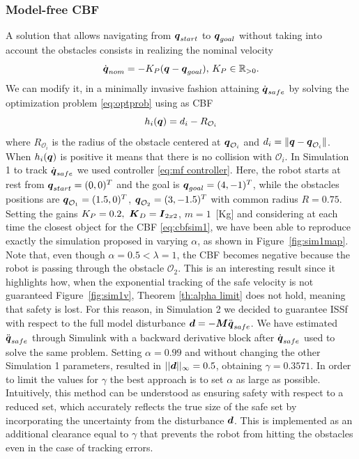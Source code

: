 \subsubsection{Model-free CBF}
A solution that allows navigating from ${\boldsymbol{q}}_{start}$ to ${\boldsymbol{q}}_{goal}$ without taking into account the obstacles consists in realizing the nominal velocity   
\begin{equation}
    \dot{{\boldsymbol{q}}}_{nom}=-K_P({\boldsymbol{q}} - {\boldsymbol{q}}_{goal}),\,K_P\in\mathbb{R}_{>0}.
\end{equation}
We can modify it, in a minimally invasive fashion attaining $\dot{\boldsymbol{q}}_{safe}$ by solving the optimization problem \eqref{eq:optprob} using as CBF
\begin{equation}\label{eq:cbfsim1}
h_i({\boldsymbol{q}})=d_{i}-R_{\mathcal{O}_i}
\end{equation}
 where $R_{\mathcal{O}_i}$ is the radius of the obstacle centered at ${\boldsymbol{q}}_{\mathcal{O}_i}$ and $d_{i} = \lVert {\boldsymbol{q}}-{\boldsymbol{q}}_{\mathcal{O}_i} \rVert$.
When $h_i({\boldsymbol{q}})$ is positive it means that there is no collision with $\mathcal{O}_i$.
In Simulation 1 to track $\dot{\boldsymbol{q}}_{safe}$ we used controller \eqref{eq:mf controller}. Here, the robot starts at rest from ${\boldsymbol{q}}_{start}=(0,0)^T$ and the goal is ${\boldsymbol{q}}_{goal}=(4,-1)^T$, while the obstacles positions are ${\boldsymbol{q}}_{\mathcal{O}_1}=(1.5,0)^T$, ${\boldsymbol{q}}_{\mathcal{O}_2}=(3,-1.5)^T$ with common radius $R=0.75$. Setting the gains $K_P = 0.2,~\boldsymbol{K}_D=\boldsymbol{I}_{2x2}$, $m=1$~[Kg] and considering at each time the closest object for the CBF \eqref{eq:cbfsim1}, we have been able to reproduce exactly the simulation proposed in \cite{mfcbf} varying $\alpha$, as shown in Figure~\ref{fig:sim1map}.
Note that, even though $\alpha=0.5 < \lambda = 1$, the CBF becomes negative because the robot is passing through the obstacle $\mathcal{O}_2$. This is an interesting result since it highlights how, when the exponential tracking of the safe velocity is not guaranteed Figure~\ref{fig:sim1v}, Theorem \ref{th:alpha limit} does not hold, meaning that safety is lost. 
For this reason, in Simulation 2 we decided to guarantee ISSf with respect to the full model disturbance $\boldsymbol{d} = -\boldsymbol{M}\ddot{{\boldsymbol{q}}}_{safe}$. We have estimated $\ddot{\boldsymbol{q}}_{safe}$ through Simulink with a backward derivative block after $\dot{\boldsymbol{q}}_{safe}$ used to solve the same problem. Setting $\alpha=0.99$ and without changing the other Simulation 1 parameters, resulted in $||\boldsymbol{d}||_\infty = 0.5$, obtaining $\gamma = 0.3571$. In order to limit the values for $\gamma$ the best approach is to set $\alpha$ as large as possible. Intuitively, this method can be understood as ensuring safety with respect to a reduced set, which accurately reflects the true size of the safe set by incorporating the uncertainty from the disturbance $\boldsymbol{d}$. This is implemented as an additional clearance equal to $\gamma$ that prevents the robot from hitting the obstacles even in the case of tracking errors. 

